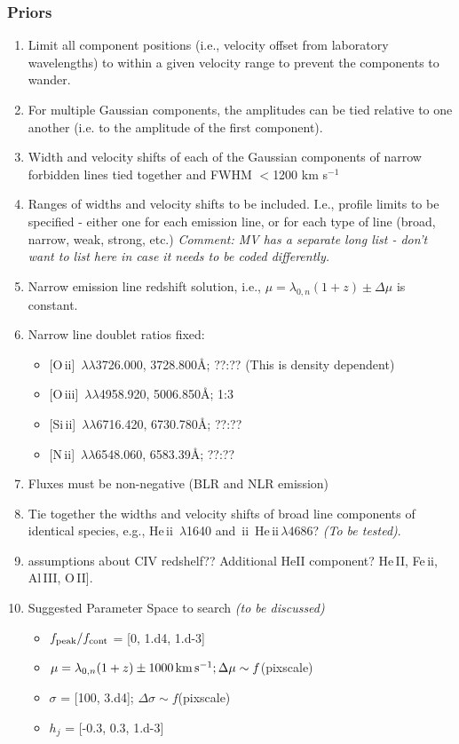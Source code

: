 \documentclass[12pt,letterpaper]{article}
\newcommand{\HeII}{\ifmmode {\rm He}\,{\sc ii}\,\lambda4686 \else 
	           He\,{\sc ii}\,$\lambda4686$\fi}
\newcommand{\heii}{He\,{\sc ii}}
\newcommand{\feii}{Fe\,{\sc ii}}
\newcommand{\nii}{N\,{\sc ii}}
\newcommand{\oii}{O\,{\sc ii}}
\newcommand{\oiii}{O\,{\sc iii}}
\newcommand{\Sizw}{Si\,{\sc ii}}
\begin{document}
\subsubsection*{Priors}
  \begin{enumerate}
    \item Limit all component positions (i.e., velocity offset from laboratory wavelengths) to within a given velocity range to prevent the components 
	  to wander.
    \item For multiple Gaussian components, the amplitudes can be tied relative to one another (i.e. to the amplitude of the first component).
    \item Width and velocity shifts of each of the Gaussian components of narrow forbidden lines tied together and FWHM $<$1200 km s$^{-1}$
    \item Ranges of widths and velocity shifts to be included. I.e., profile limits to 
          be specified - either one for each emission line, or for each type of line 
          (broad, narrow, weak, strong, etc.) \textit{Comment: MV has a separate long list - don't want to list here in case it needs to 
           be coded differently.}
    \item Narrow emission line redshift solution, i.e., $\mu = \lambda_{0,n}(1+z)\pm \Delta \mu$ is constant.
    \item Narrow line doublet ratios fixed:
  \begin{itemize}
        \item {[\oii]\, $\lambda \lambda$3726.000, 3728.800\AA; ??:?? (This is density dependent)}
        \item {[\oiii]\, $\lambda \lambda$4958.920, 5006.850\AA;  1:3}
        \item {[\Sizw]\, $\lambda \lambda$6716.420, 6730.780\AA; ??:??}
        \item {[\nii]\, $\lambda \lambda$6548.060, 6583.39\AA; ??:??}
      \end{itemize}
    \item Fluxes must be non-negative (BLR and NLR emission)
    \item Tie together the widths and velocity shifts of broad line components of identical species, e.g., \heii\, $\lambda$1640 and \HeII?  \textit{(To be tested)}.
    \item assumptions about CIV redshelf?? Additional HeII component? He\,II, \feii, Al\,III, O\,II].
    \item Suggested Parameter Space to search \textit{(to be discussed)}
      \begin{itemize}
        \item $f_{\rm peak}/f_{\rm cont}$ = [0, 1.d4, 1.d-3]
        \item $\mu = \lambda_{0,n}(1+z)\pm 1000\, {\rm km}\, {\rm s}^{-1}; \Delta \mu \sim f$(pixscale)
        \item $\sigma$ = [100, 3.d4]; $\Delta \sigma \sim f$(pixscale)
        \item $h_j$ = [-0.3, 0.3, 1.d-3]
      \end{itemize}
  \end{enumerate}
\end{document}
